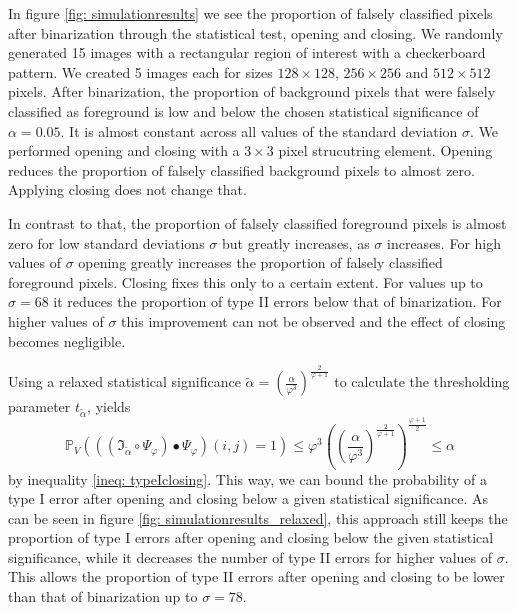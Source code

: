 \documentclass[a4paper,12pt]{article}
\theoremstyle{plain}
\theoremstyle{definition}
\begin{document}
In figure \ref{fig: simulationresults} we see the proportion of falsely classified pixels after binarization through the statistical test, opening and closing. We randomly generated 15 images with a rectangular region of interest with a checkerboard pattern. We created 5 images each for sizes $128 \times 128$, $256 \times 256$ and $512 \times 512$ pixels. After binarization, the proportion of background pixels that were falsely classified as foreground is low and below the chosen statistical significance of $\alpha = 0.05$. It is almost constant across all values of the standard deviation $\sigma$. We performed opening and closing with a $3 \times 3$ pixel strucutring element. Opening reduces the proportion of falsely classified background pixels to almost zero. Applying closing does not change that.

In contrast to that, the proportion of falsely classified foreground pixels is almost zero for low standard deviations $\sigma$ but greatly increases, as $\sigma$ increases. For high values of $\sigma$ opening greatly increases the proportion of falsely classified foreground pixels. Closing fixes this only to a certain extent. For values up to $\sigma = 68$ it reduces the proportion of type II errors below that of binarization. For higher values of $\sigma$ this improvement can not be observed and the effect of closing becomes negligible.

Using a relaxed statistical significance $\tilde{\alpha} = \left( \frac{\alpha}{\varphi^3} \right)^{\frac{2}{\varphi + 1}}$ to calculate the thresholding parameter $t_{\tilde{\alpha}}$, yields
\begin{equation*}
	\mathbb{P}_V\left( ((\mathfrak{I}_{\tilde{\alpha}} \circ \Psi_\varphi) \bullet \Psi_\varphi)(i, j) = 1 \right) \leq \varphi^3 \left( \left( \frac{\alpha}{\varphi^3} \right)^{\frac{2}{\varphi + 1}} \right)^{\frac{\varphi + 1}{2}} \leq \alpha
\end{equation*}
by inequality \eqref{ineq: typeIclosing}. This way, we can bound the probability of a type I error after opening and closing below a given statistical significance. As can be seen in figure \ref{fig: simulationresults_relaxed}, this approach still keeps the proportion of type I errors after opening and closing below the given statistical significance, while it decreases the number of type II errors for higher values of $\sigma$. This allows the proportion of type II errors after opening and closing to be lower than that of binarization up to $\sigma = 78$.
\end{document}
